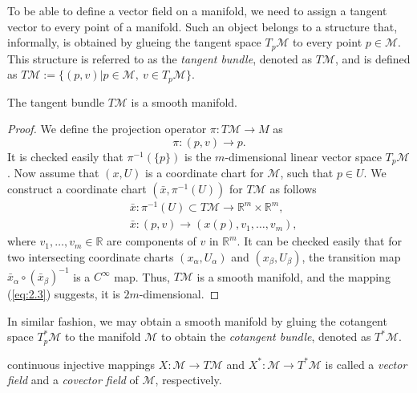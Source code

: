 To be able to define a vector field on a manifold, we need to assign a tangent vector to every point of a manifold. Such an object belongs to a structure that, informally, is obtained by glueing the tangent space $T_p\mathcal M$ to every point $p\in \mathcal M$. This structure is referred to as the \emph{tangent bundle}, denoted as $T \mathcal M$, and is defined as $T \mathcal M := \{ (p,v) | p\in \mathcal M, \ v \in T_p \mathcal M\}$.
\begin{theorem}
\cite{robbin2011introduction} The tangent bundle $T\mathcal M$ is a smooth manifold.
\end{theorem}

\begin{proof}
We define the projection operator $\pi:T\mathcal M \to M$ as
\begin{equation} \label{eq:2.2}
	\pi : (p,v) \to p.
\end{equation}
It is checked easily that $\pi^{-1}(\{p\})$ is the $m$-dimensional linear vector space $T_{p} \mathcal M$. Now assume that $(x,U)$ is a coordinate chart for $\mathcal M$, such that $p\in U$. We construct a coordinate chart $(\bar x , \pi^{-1}(U) )$ for $T\mathcal M$ as follows 
\begin{equation} \label{eq:2.3}
	\begin{aligned}
		&\bar x : \pi^{-1}(U) \subset T \mathcal M \to \mathbb R^m \times \mathbb R^m, \\
		&\bar x : (p,v) \to (x(p),v_1,\dots,v_m),
	\end{aligned}
\end{equation}
where $v_1,\dots,v_m\in \mathbb R$ are components of $v$ in $\mathbb R^m$. It can be checked easily that for two intersecting coordinate charts $(x_\alpha,U_\alpha)$ and $(x_\beta, U_\beta)$, the transition map $\bar x_{\alpha} \circ (\bar x_\beta)^{-1}$ is a $C^{\infty}$ map. Thus, $T \mathcal M$ is a smooth manifold, and the mapping (\ref{eq:2.3}) suggests, it is $2m$-dimensional.
\end{proof}

In similar fashion, we may obtain a smooth manifold by gluing the cotangent space $T^*_p \mathcal M$ to the manifold $\mathcal M$ to obtain the \emph{cotangent bundle}, denoted as $T^* \mathcal M$. 

\begin{definition}
continuous injective mappings $X:\mathcal M \to T \mathcal M$ and $X^*:\mathcal M \to T^* \mathcal M$ is called a \emph{vector field} and a \emph{covector field} of $\mathcal M$, respectively.
\end{definition}

